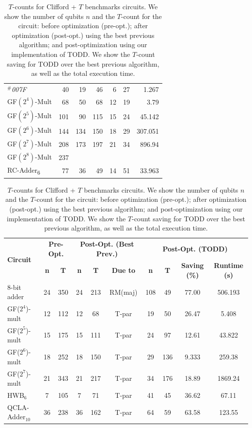 \documentclass[notitlepage]{article}
\theoremstyle{definition}
\theoremstyle{problem}
\theoremstyle{lemma}
\begin{document}
\begin{table}[h!]
\begin{tabular}{ |>{\columncolor{white}}l|>{\columncolor{blue!25}}r|>{\columncolor{green!25}}r|>{\columncolor{gray!10}}r|>{\columncolor{white}}r|>{\columncolor{gray!10}}r|>{\columncolor{white}}r| }
			\emph{$^\#$007F} \cite{41_soeken} & 40 & 19 & 46 & 6 & 27 & 1.267 \\
			GF$(2^4)$-Mult & 68 & 50 & 68 & 12 & 19 & 3.79 \\
			GF$(2^5)$-Mult & 101 & 90 & 115 & 15 & 24 & 45.142 \\
			GF$(2^6)$-Mult & 144 & 134 & 150 & 18 & 29 & 307.051 \\
			GF$(2^7)$-Mult & 208 & 173 & 197 & 21 & 34 & 896.94 \\
			GF$(2^8)$-Mult & 237 &  &  &  &  & \\
			RC-Adder\textsubscript{6} & 77 & 36 & 49 & 14 & 51 & 33.963 \\
			\hline
		\end{tabular}\fi
		\caption{$T$-counts for Clifford + $T$ benchmarks circuits. We show the number of qubits $n$ and the $T$-count for the circuit: before optimization (pre-opt.);  after optimization (post-opt.) using the best previous algorithm; and post-optimization using our implementation of TODD. We show the $T$-count saving for TODD over the best previous algorithm, as well as the total execution time.}
		\begin{tabularx}{0.85\textwidth}{|X|cc|ccc|cccc|}
		\hline
		\multirow{2}{*}{\textbf{Circuit}} & \multicolumn{2}{c|}{\textbf{Pre-Opt.}} & \multicolumn{3}{c|}{\textbf{Post-Opt. (Best Prev.)}} & \multicolumn{4}{c|}{\textbf{Post-Opt. (TODD)}} \\
		& \textbf{n} & \textbf{T} & \textbf{n} & \textbf{T} & \textbf{Due to} & \textbf{n} & \textbf{T} & \textbf{\scriptsize Saving (\%)} & \textbf{Runtime (s)} \\
		\hline
		8-bit adder & 24 & 350 & 24 & 213 & RM(maj) & 108 & 49 & 77.00 & 506.193 \\		
		GF($2^4$)-mult & 12 & 112 & 12 & 68 & T-par & 19 & 50 & 26.47 & 5.408 \\
		GF($2^5$)-mult & 15 & 175 & 15 & 111 & T-par & 24 & 97 & 12.61 & 43.822 \\
		GF($2^6$)-mult & 18 & 252 & 18 & 150 & T-par & 29 & 136 & 9.333 & 259.38 \\
		GF($2^7$)-mult & 21 & 343 & 21 & 217 & T-par & 34 & 176 & 18.89 & 1869.24 \\		
		HWB$_6$ & 7 & 105 & 7 & 71 & T-par & 41 & 45 & 36.62 & 67.11 \\
		QCLA-Adder$_{10}$ & 36 & 238 & 36 & 162 & T-par & 64 & 59 & 63.58 & 123.55 \\

\end{tabularx}
\end{table}
\end{document}
